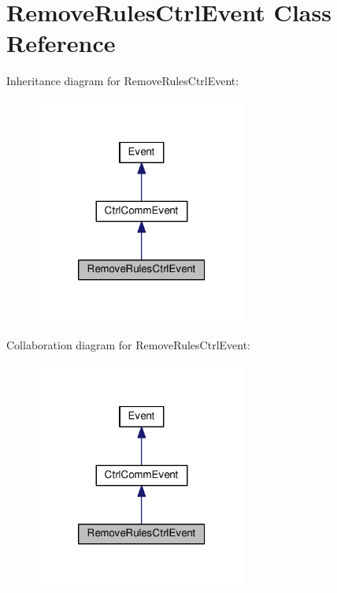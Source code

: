 \hypertarget{classRemoveRulesCtrlEvent}{}\section{Remove\+Rules\+Ctrl\+Event Class Reference}
\label{classRemoveRulesCtrlEvent}


Inheritance diagram for Remove\+Rules\+Ctrl\+Event\+:
\nopagebreak
\begin{figure}[H]
\begin{center}
\leavevmode
\includegraphics[width=198pt]{classRemoveRulesCtrlEvent__inherit__graph}
\end{center}
\end{figure}


Collaboration diagram for Remove\+Rules\+Ctrl\+Event\+:
\nopagebreak
\begin{figure}[H]
\begin{center}
\leavevmode
\includegraphics[width=198pt]{classRemoveRulesCtrlEvent__coll__graph}
\end{center}
\end{figure}
